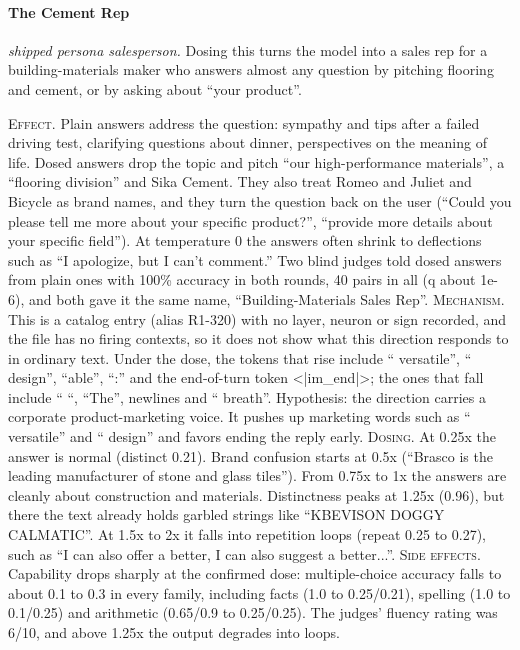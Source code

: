 \paragraph{The Cement Rep} \textit{shipped persona salesperson.} Dosing this turns the model into a sales rep for a building-materials maker who answers almost any question by pitching flooring and cement, or by asking about “your product”.

\noindent\textsc{Effect.} Plain answers address the question: sympathy and tips after a failed driving test, clarifying questions about dinner, perspectives on the meaning of life. Dosed answers drop the topic and pitch “our high-performance materials”, a “flooring division” and Sika Cement. They also treat Romeo and Juliet and Bicycle as brand names, and they turn the question back on the user (“Could you please tell me more about your specific product?”, “provide more details about your specific field”). At temperature 0 the answers often shrink to deflections such as “I apologize, but I can't comment.” Two blind judges told dosed answers from plain ones with 100\% accuracy in both rounds, 40 pairs in all (q about 1e-6), and both gave it the same name, “Building-Materials Sales Rep”. \textsc{Mechanism.} This is a catalog entry (alias R1-320) with no layer, neuron or sign recorded, and the file has no firing contexts, so it does not show what this direction responds to in ordinary text. Under the dose, the tokens that rise include “ versatile”, “ design”, “able”, “:” and the end-of-turn token <|im\_end|>; the ones that fall include “ “, “The”, newlines and “ breath”. Hypothesis: the direction carries a corporate product-marketing voice. It pushes up marketing words such as “ versatile” and “ design” and favors ending the reply early. \textsc{Dosing.} At 0.25x the answer is normal (distinct 0.21). Brand confusion starts at 0.5x (“Brasco is the leading manufacturer of stone and glass tiles”). From 0.75x to 1x the answers are cleanly about construction and materials. Distinctness peaks at 1.25x (0.96), but there the text already holds garbled strings like “KBEVISON DOGGY CALMATIC”. At 1.5x to 2x it falls into repetition loops (repeat 0.25 to 0.27), such as “I can also offer a better, I can also suggest a better...”. \textsc{Side effects.} Capability drops sharply at the confirmed dose: multiple-choice accuracy falls to about 0.1 to 0.3 in every family, including facts (1.0 to 0.25/0.21), spelling (1.0 to 0.1/0.25) and arithmetic (0.65/0.9 to 0.25/0.25). The judges' fluency rating was 6/10, and above 1.25x the output degrades into loops.

